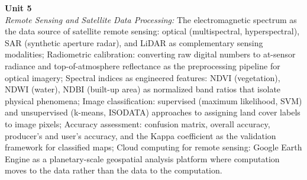 \noindent\textbf{Unit 5} \\
\textit{Remote Sensing and Satellite Data Processing:} The electromagnetic spectrum as the data source of satellite remote sensing: optical (multispectral, hyperspectral), SAR (synthetic aperture radar), and LiDAR as complementary sensing modalities; Radiometric calibration: converting raw digital numbers to at-sensor radiance and top-of-atmosphere reflectance as the preprocessing pipeline for optical imagery; Spectral indices as engineered features: NDVI (vegetation), NDWI (water), NDBI (built-up area) as normalized band ratios that isolate physical phenomena; Image classification: supervised (maximum likelihood, SVM) and unsupervised (k-means, ISODATA) approaches to assigning land cover labels to image pixels; Accuracy assessment: confusion matrix, overall accuracy, producer's and user's accuracy, and the Kappa coefficient as the validation framework for classified maps; Cloud computing for remote sensing: Google Earth Engine as a planetary-scale geospatial analysis platform where computation moves to the data rather than the data to the computation.

\newpage
{}
